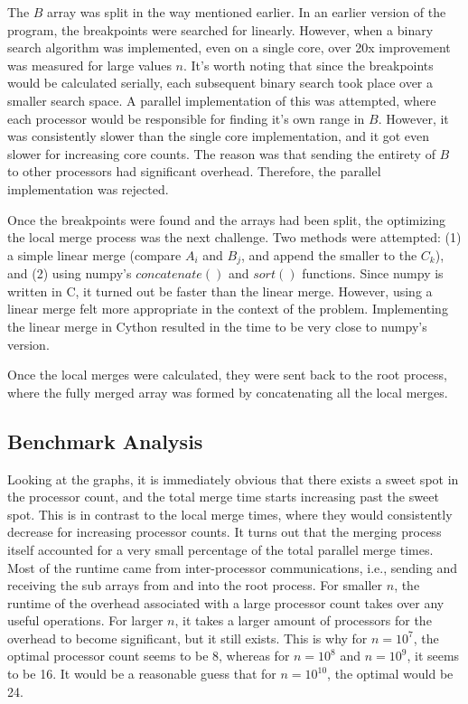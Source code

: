 \documentclass[12pt]{article}
\begin{document}
{    The $B$ array was split in the way mentioned earlier. In an earlier version of the program, the breakpoints were searched for linearly. However, when a binary search algorithm was implemented, even on a single core, over 20x improvement was measured for large values $n$. It's worth noting that since the breakpoints would be calculated serially, each subsequent binary search took place over a smaller search space. A parallel implementation of this was attempted, where each processor would be responsible for finding it's own range in $B$. However, it was consistently slower than the single core implementation, and it got even slower for increasing core counts. The reason was that sending the entirety of $B$ to other processors had significant overhead. Therefore, the parallel implementation was rejected.

    Once the breakpoints were found and the arrays had been split, the optimizing the local merge process was the next challenge. Two methods were attempted: (1) a simple linear merge (compare $A_i$ and $B_j$, and append the smaller to the $C_k$), and (2) using numpy's $concatenate()$ and $sort()$ functions. Since numpy is written in C, it turned out be faster than the linear merge. However, using a linear merge felt more appropriate in the context of the problem. Implementing the linear merge in Cython resulted in the time to be very close to numpy's version.

    Once the local merges were calculated, they were sent back to the root process, where the fully merged array was formed by concatenating all the local merges. 

    \subsection{Benchmark Analysis}
    Looking at the graphs, it is immediately obvious that there exists a sweet spot in the processor count, and the total merge time starts increasing past the sweet spot. This is in contrast to the local merge times, where they would consistently decrease for increasing processor counts. It turns out that the merging process itself accounted for a very small percentage of the total parallel merge times. Most of the runtime came from inter-processor communications, i.e., sending and receiving the sub arrays from and into the root process. For smaller $n$, the runtime of the overhead associated with a large processor count takes over any useful operations. For larger $n$, it takes a larger amount of processors for the overhead to become significant, but it still exists. This is why for $n = 10^7$, the optimal processor count seems to be 8, whereas for $n = 10^8$ and $n = 10^9$, it seems to be 16. It would be a reasonable guess that for $n = 10^{10}$, the optimal would be 24.

}
\end{document}
